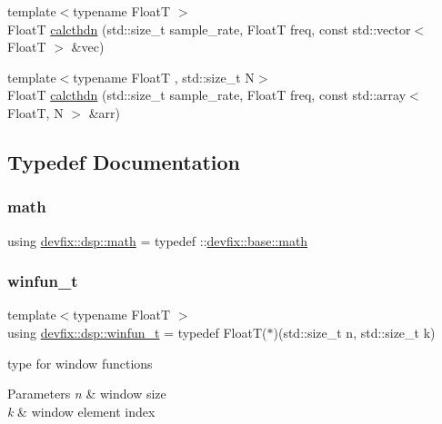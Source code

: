 \begin{DoxyCompactItemize}
\item 
{\footnotesize template$<$typename FloatT $>$ }\\FloatT \hyperlink{namespacedevfix_1_1dsp_a424b6903cca9ea1aebfa4712ea070a1e}{calcthdn} (std\+::size\+\_\+t sample\+\_\+rate, FloatT freq, const std\+::vector$<$ FloatT $>$ \&vec)
\item 
{\footnotesize template$<$typename FloatT , std\+::size\+\_\+t N$>$ }\\FloatT \hyperlink{namespacedevfix_1_1dsp_a54194236560fd3dd40df38df44966d8e}{calcthdn} (std\+::size\+\_\+t sample\+\_\+rate, FloatT freq, const std\+::array$<$ FloatT, N $>$ \&arr)
\end{DoxyCompactItemize}


\subsection{Typedef Documentation}
\mbox{\label{namespacedevfix_1_1dsp_a4d41815e9c6481fb760733a11d5b633a}} 
\subsubsection{\texorpdfstring{math}{math}}
{\footnotesize\ttfamily using \hyperlink{namespacedevfix_1_1dsp_a4d41815e9c6481fb760733a11d5b633a}{devfix\+::dsp\+::math} = typedef \+::\hyperlink{structdevfix_1_1base_1_1math}{devfix\+::base\+::math}}

\mbox{\label{namespacedevfix_1_1dsp_a6667d1bec03c0d82f87521b87d3fcf24}} 
\subsubsection{\texorpdfstring{winfun\+\_\+t}{winfun\_t}}
{\footnotesize\ttfamily template$<$typename FloatT $>$ \\
using \hyperlink{namespacedevfix_1_1dsp_a6667d1bec03c0d82f87521b87d3fcf24}{devfix\+::dsp\+::winfun\+\_\+t} = typedef FloatT($\ast$)(std\+::size\+\_\+t n, std\+::size\+\_\+t k)}



type for window functions 


\begin{DoxyParams}{Parameters}
{\em n} & window size \\
\hline
{\em k} & window element index \\
\hline
\end{DoxyParams}


